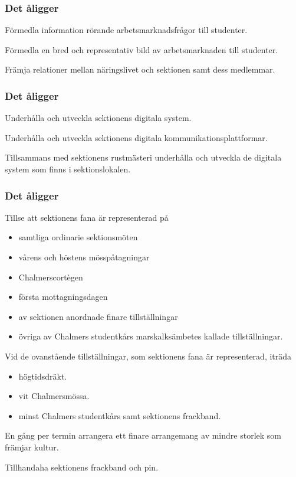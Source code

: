\subsubsection{Det åligger \ARMIT{}}
\begin{att}
	\item Förmedla information rörande arbetsmarknadsfrågor till studenter.
	\item Förmedla en bred och representativ bild av arbetsmarknaden till studenter.
	\item Främja relationer mellan näringslivet och sektionen samt dess medlemmar.
\end{att}

\subsubsection{Det åligger \DIGIT}
\begin{att}
	\item Underhålla och utveckla sektionens digitala system.
	\item Underhålla och utveckla sektionens digitala kommunikationsplattformar.
	\item Tillsammans med sektionens rustmästeri underhålla och utveckla de digitala system som finns i sektionslokalen.
\end{att}


\subsubsection{Det åligger \FANBARERIT}
\label{sec:fanbarerit:function}
\begin{att}
	\item Tillse att sektionens fana är representerad på
	\begin{itemize}
		\item samtliga ordinarie sektionsmöten
		\item vårens och höstens mösspåtagningar
		\item Chalmerscortègen
		\item första mottagningsdagen
		\item av sektionen anordnade finare tillställningar
		\item övriga av Chalmers studentkårs marskalksämbetes kallade tillställningar.
	\end{itemize}
	\item Vid de ovanstående tillställningar, som sektionens fana är representerad, iträda
	\begin{itemize}
		\item högtidsdräkt.
		\item vit Chalmersmössa.
		\item minst Chalmers studentkårs samt sektionens frackband.
	\end{itemize}
	\item En gång per termin arrangera ett finare arrangemang av mindre storlek som främjar kultur.
	\item Tillhandaha sektionens frackband och pin.
\end{att}

